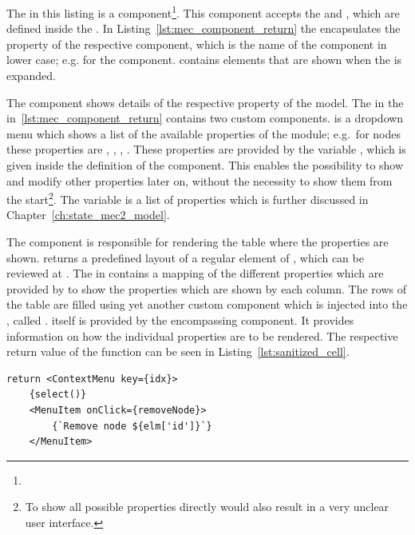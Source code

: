 The  in this listing is a  component\footnote{}.
This component accepts the  and , which are defined inside the .
In Listing~\ref{lst:mec_component_return} the  encapsulates the  property of the respective component, which is the name of the component in lower case; e.g.  for the  component.
 contains elements that are shown when the  is expanded.

The  component shows details of the respective property of the  model.
The  in the  in~\ref{lst:mec_component_return} contains two custom components.
 is a dropdown menu which shows a list of the available properties of the module; e.g.\ for nodes these properties are , , , .
These properties are provided by the variable , which is given inside the definition of the component.
This enables the possibility to show and modify other properties later on, without the necessity to show them from the start\footnote{To show all possible properties directly would also result in a very unclear user interface.}.
The  variable is a list of properties which is further discussed in Chapter~\ref{ch:state_mec2_model}.

The  component is responsible for rendering the table where the properties are shown.
 returns a predefined layout of a regular  element of , which can be reviewed at .
The  in  contains a mapping of the different properties which are provided by  to show the properties which are shown by each column.
The rows of the table are filled using yet another custom component which is injected into the , called .
 itself is provided by the encompassing component.
It provides information on how the individual properties are to be rendered.
The respective return value of the  function can be seen in Listing~\ref{lst:sanitized_cell}.

\begin{lstlisting}[label={lst:sanitized_cell}, caption={Return value of the \code{Node} components \code{SanitizedCell} function.}]
return <ContextMenu key={idx}>
    {select()}
    <MenuItem onClick={removeNode}>
        {`Remove node ${elm['id']}`}
    </MenuItem>
\end{lstlisting}

